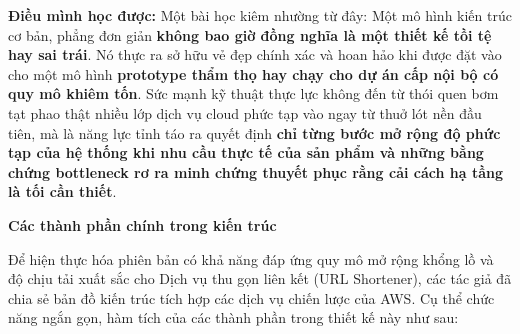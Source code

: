 \textbf{Điều mình học được:} Một bài học kiêm nhường từ đây: Một mô hình
kiến trúc cơ bản, phẳng đơn giản \textbf{không bao giờ đồng nghĩa là một
thiết kế tồi tệ hay sai trái}. Nó thực ra sở hữu vẻ đẹp chính xác và
hoan hảo khi được đặt vào cho một mô hình \textbf{prototype thẩm thọ hay
chạy cho dự án cấp nội bộ có quy mô khiêm tốn}. Sức mạnh kỹ thuật thực
lực không đến từ thói quen bơm tạt phao thật nhiều lớp dịch vụ cloud
phức tạp vào ngay từ thuở lót nền đầu tiên, mà là năng lực tỉnh táo ra
quyết định \textbf{chỉ từng bước mở rộng độ phức tạp của hệ thống khi
nhu cầu thực tế của sản phẩm và những bằng chứng bottleneck rơ ra minh
chứng thuyết phục rằng cải cách hạ tầng là tối cần thiết}.

\vspace{0.5em}\noindent\textbf{Các thành phần chính trong kiến
trúc}\par

Để hiện thực hóa phiên bản có khả năng đáp ứng quy mô mở rộng khổng lồ
và độ chịu tải xuất sắc cho Dịch vụ thu gọn liên kết (URL Shortener),
các tác giả đã chia sẻ bản đồ kiến trúc tích hợp các dịch vụ chiến lược
của AWS. Cụ thể chức năng ngắn gọn, hàm tích của các thành phần trong
thiết kế này như sau:

